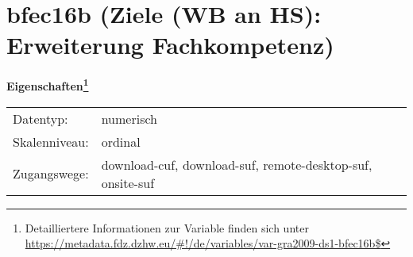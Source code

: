 
    \setcounter{footnote}{0}

    \vspace*{-1.8cm}
	\section{bfec16b (Ziele (WB an HS): Erweiterung Fachkompetenz)}
	\label{section:bfec16b}



    \vspace*{0.5cm}
    \noindent\textbf{Eigenschaften\footnote{Detailliertere Informationen zur Variable finden sich unter
		\url{https://metadata.fdz.dzhw.eu/\#!/de/variables/var-gra2009-ds1-bfec16b$}}}\\
	\begin{tabularx}{\hsize}{@{}lX}
	Datentyp: & numerisch \\
	Skalenniveau: & ordinal \\
	Zugangswege: &
	  download-cuf, 
	  download-suf, 
	  remote-desktop-suf, 
	  onsite-suf
 \\
    \end{tabularx}




